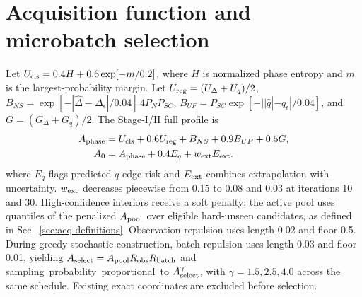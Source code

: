 \section{Acquisition function and microbatch selection}
\begin{samepage}
Let $U_{\rm cls}=0.4H+0.6\exp[-m/0.2]$, where $H$ is normalized phase entropy and $m$ is the largest-probability margin. Let $U_{\rm reg}=(U_\Delta+U_q)/2$, $B_{NS}=\exp[-|\hat\Delta-\Delta_\epsilon|/0.04]\,4P_NP_{SC}$, \mbox{$B_{UF}=P_{SC}\exp[-||\hat q|-q_\epsilon|/0.04]$}, and $G=(G_\Delta+G_q)/2$.  The Stage-I/II full profile is
\begin{align} A_{\rm phase}&=U_{\rm cls}+0.6U_{\rm reg}+B_{NS}+0.9B_{UF}+0.5G,\notag\\ A_0&=A_{\rm phase}+0.4E_q+w_{\rm ext}E_{\rm ext}.\end{align}
where $E_q$ flags predicted $q$-edge risk and $E_{\rm ext}$ combines extrapolation with uncertainty. $w_{\rm ext}$ decreases piecewise from 0.15 to 0.08 and 0.03 at iterations 10 and 30. High-confidence interiors receive a soft penalty; the active pool uses quantiles of the penalized $A_{\rm pool}$ over eligible hard-unseen candidates, as defined in Sec.~\ref{sec:acq-definitions}.  Observation repulsion uses length 0.02 and floor 0.5. During greedy stochastic construction, batch repulsion uses length 0.03 and floor 0.01, yielding $A_{\rm select}=A_{\rm pool}R_{\rm obs}R_{\rm batch}$ and \mbox{sampling probability proportional to} $A_{\rm select}^\gamma$, with $\gamma=1.5,2.5,4.0$ across the same schedule. Existing exact coordinates are excluded before selection.
\end{samepage}
